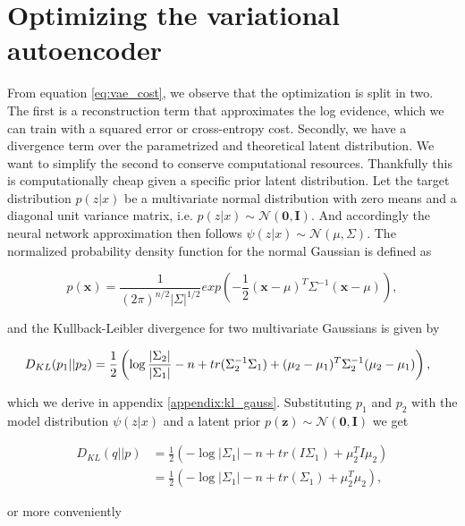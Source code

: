 \section{Optimizing the variational autoencoder}

From equation \ref{eq:vae_cost}, we observe that the optimization is split in two. The first is a reconstruction term that approximates the log evidence, which we can train with a squared error or cross-entropy cost. Secondly, we have a divergence term over the parametrized and theoretical latent distribution. We want to simplify the second to conserve computational resources. Thankfully this is computationally cheap given a specific prior latent distribution. Let the target distribution $p(z | x) $ be a multivariate normal distribution with zero means and a diagonal unit variance matrix, i.e. $p(z | x) \sim  \mathcal{N}(\mathbf{0}, \mathbf{I})$. And accordingly the neural network approximation then follows $\psi(z | x) \sim \mathcal{N}(\mu, \Sigma)$. The normalized probability density function for the normal Gaussian is defined as 

\begin{equation}
p(\mathbf{x}) = \frac{1}{(2\pi)^{n/2}|\Sigma|^{1/2}}exp(-\frac{1}{2}(\mathbf{x} - \mathbb{\mu})^T\Sigma^{-1}(\mathbf{x}-\mu)),
\end{equation}

\noindent and the Kullback-Leibler divergence for two multivariate Gaussians is given by 


\begin{equation}
\hspace*{-0.1in}
D_{KL}(p_1|| p_2 ) = \frac{1}{2} \left( \log \frac{|\Sigma_2|}{|\Sigma_1|} -n + tr(\Sigma^{-1}_2 \Sigma_1) + (\mu_2 - \mu_1)^T\Sigma_2^{-1}(\mu_2 - \mu_1) \right),
\end{equation}

\noindent which we derive in appendix \ref{appendix:kl_gauss}. Substituting $p_1$ and $p_2$ with the model distribution $\psi(z|x)$ and a latent prior $p(\mathbf{z}) \sim \mathcal{N}(\mathbf{0}, \mathbf{I})$ we get 

\begin{align*}
D_{KL}(q||p) &= \frac{1}{2} \left( - \log {|\Sigma_1|} -n + tr(I \Sigma_1) + \mu_2 ^TI\mu_2 \right) \\
&= \frac{1}{2} \left( - \log {|\Sigma_1|} -n + tr(\Sigma_1) + \mu_2 ^T\mu_2 \right),
\end{align*}

\noindent or more conveniently

